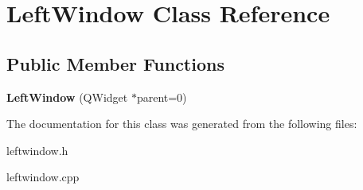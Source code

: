 \hypertarget{classLeftWindow}{\section{Left\-Window Class Reference}
\label{classLeftWindow}
}
\subsection*{Public Member Functions}
\begin{DoxyCompactItemize}
\item 
\hypertarget{classLeftWindow_a112aff90c85597f32129f5381e13ff6a}{{\bfseries Left\-Window} (Q\-Widget $\ast$parent=0)}\label{classLeftWindow_a112aff90c85597f32129f5381e13ff6a}

\end{DoxyCompactItemize}


The documentation for this class was generated from the following files\-:\begin{DoxyCompactItemize}
\item 
leftwindow.\-h\item 
leftwindow.\-cpp\end{DoxyCompactItemize}
